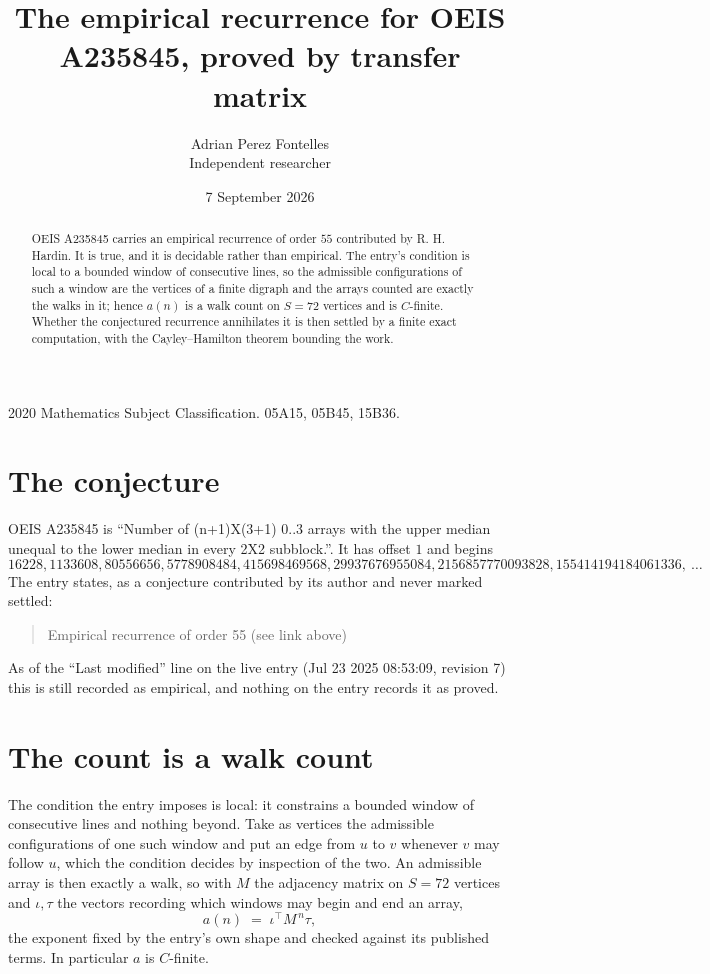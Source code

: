 \documentclass[11pt,a4paper]{article}
\title{The empirical recurrence for OEIS A235845, proved by transfer matrix}
\author{Adrian Perez Fontelles\\ \small Independent researcher}
\date{7 September 2026}
\theoremstyle{plain}
\theoremstyle{definition}
\begin{document}
\maketitle

\begin{abstract}
OEIS A235845 carries an empirical recurrence of order $55$ contributed by R. H. Hardin. It is
true, and it is decidable rather than empirical. The entry's condition is local to a bounded window of consecutive lines, so
the admissible configurations of such a window are the vertices of a finite digraph and the
arrays counted are exactly the walks in it; hence $a(n)$ is a walk count on $S=72$ vertices
and is $C$-finite. Whether the conjectured recurrence annihilates it is then settled by a
finite exact computation, with the Cayley--Hamilton theorem bounding the work.
\end{abstract}

\noindent\small 2020 Mathematics Subject Classification. 05A15, 05B45, 15B36.\normalsize

\section{The conjecture}

OEIS A235845 is ``Number of (n+1)X(3+1) 0..3 arrays with the upper median unequal to the lower median in every 2X2 subblock.''. It has offset $1$ and begins
\[
16228, 1133608, 80556656, 5778908484, 415698469568, 29937676955084, 2156857770093828, 155414194184061336,\ \dots
\]
The entry states, as a conjecture contributed by its author and never marked settled:
\begin{quote}
Empirical recurrence of order 55 (see link above)
\end{quote}
As of the ``Last modified'' line on the live entry (Jul 23 2025 08:53:09, revision 7) this is still
recorded as empirical, and nothing on the entry records it as proved.

\section{The count is a walk count}

The condition the entry imposes is local: it constrains a bounded window of consecutive lines and nothing beyond. Take as
vertices the admissible configurations of one such window and put an edge from $u$ to $v$
whenever $v$ may follow $u$, which the condition decides by inspection of the two. An
admissible array is then exactly a walk, so with $M$ the adjacency matrix on $S=72$ vertices
and $\iota,\tau$ the vectors recording which windows may begin and end an array,
\[
a(n)\;=\;\iota^{\!\top}M^{\,n}\tau ,
\]
the exponent fixed by the entry's own shape and checked against its published terms. In
particular $a$ is $C$-finite.
\end{document}
